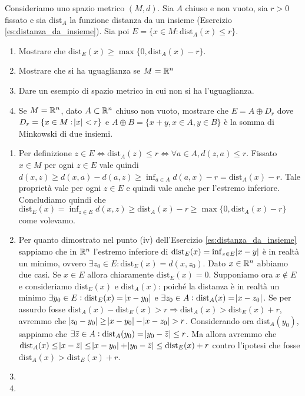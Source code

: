 \begin{es}
  Consideriamo uno spazio metrico $ (M, d) $. Sia $ A $ chiuso e non vuoto, sia $ r > 0 $ fissato e sia $ \mathrm{dist}_A $ la funzione distanza da un insieme (Esercizio \ref{es:distanza_da_insieme}). Sia poi $ E = \{x \in M : \mathrm{dist}_A(x) \leq r\} $.
  \begin{enumerate}[label = (\roman*)]
  \item Mostrare che $ \mathrm{dist}_E(x) \geq \max{\{0, \mathrm{dist}_A(x) - r\}} $.
  \item Mostrare che si ha uguaglianza se $ M = \mathbb{R}^n $
  \item Dare un esempio di spazio metrico in cui non si ha l'uguaglianza.
  \item Se $ M = \mathbb{R}^n $, dato $ A \subset \mathbb{R}^n $ chiuso non vuoto, mostrare che $ E = A \oplus D_r $ dove $ D_r = \{x \in M : \abs{x} < r \} $ e $ A \oplus B = \{x + y, x \in A, y \in B\} $ è la somma di Minkowski di due insiemi.
  \end{enumerate}
\end{es}
%
\begin{enumerate}[label = (\roman*)]
\item Per definizione $ z \in E \iff \mathrm{dist}_A(z) \leq r \iff \forall a \in A, d(z, a) \leq r $. Fissato $ x \in M $ per ogni $ z \in E $ vale quindi $ d(x, z) \geq d(x, a) - d(a, z) \geq \inf_{a \in A} d(a, x) - r = \mathrm{dist}_A(x) - r $. Tale proprietà vale per ogni $ z \in E $ e quindi vale anche per l'estremo inferiore. Concludiamo quindi che $ \mathrm{dist}_E(x) = \inf_{z \in E} d(x, z) \geq \mathrm{dist}_A(x) - r \geq \max{\{0, \mathrm{dist}_A(x) - r\}} $ come volevamo.
\item Per quanto dimostrato nel punto (iv) dell'Esercizio \ref{es:distanza_da_insieme} sappiamo che in $ \mathbb{R}^n $ l'estremo inferiore di $ \mathrm{dist}_E(x) = \inf_{z \in E} \abs{x - y} $ è in realtà un minimo, ovvero $ \exists z_0 \in E : \mathrm{dist}_E(x) = d(x, z_0) $. Dato $ x \in \mathbb{R}^n $ abbiamo due casi. Se $ x \in E $ allora chiaramente $ \mathrm{dist}_E(x) = 0 $. Supponiamo ora $ x \notin E $ e consideriamo $ \mathrm{dist}_E(x) $ e $ \mathrm{dist}_A(x) $: poiché la distanza è in realtà un minimo $ \exists y_0 \in E : \mathrm{dist}_E(x) = \abs{x - y_0} $ e $ \exists z_0 \in A : \mathrm{dist}_A(x) = \abs{x - z_0} $. Se per assurdo fosse $ \mathrm{dist}_A(x) - \mathrm{dist}_E(x) > r \Rightarrow
  \mathrm{dist}_A(x) > \mathrm{dist}_E(x) + r $, avremmo che $ \abs{z_0 - y_0} \geq \abs{x - y_0} - \abs{x - z_0} > r $. Considerando ora $ \mathrm{dist}_A(y_0) $, sappiamo che $ \exists \bar{z} \in A : \mathrm{dist}_A(y_0) = \abs{y_0 - \bar{z}} \leq r $. Ma allora avremmo che $ \mathrm{dist}_A(x) \leq \abs{x - \bar{z}} \leq \abs{x - y_0} + \abs{y_0 - \bar{z}} \leq \mathrm{dist}_E(x) + r $ contro l'ipotesi che fosse $ \mathrm{dist}_A(x) > \mathrm{dist}_E(x) + r $.
\item
\item
\end{enumerate}

